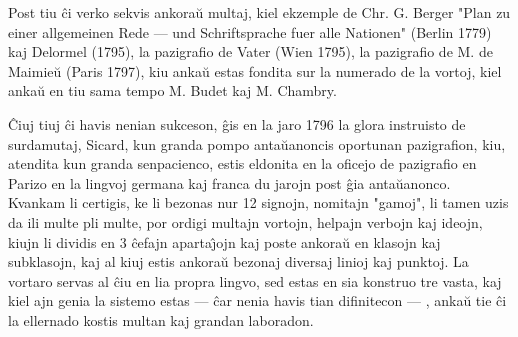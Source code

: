    Post tiu \^ci verko sekvis ankora\u u multaj, kiel ekzemple de
Chr. G. Berger "Plan zu einer allgemeinen Rede --- und
Schriftsprache fuer alle Nationen" (Berlin 1779) kaj Delormel
(1795), la pazigrafio de Vater (Wien 1795), la pazigrafio de M. de
Maimie\u u (Paris 1797), kiu anka\u u estas fondita sur la numerado
de la vortoj, kiel anka\u u en tiu sama tempo M. Budet kaj M.
Chambry.

   \^Ciuj tiuj \^ci havis nenian sukceson, \^gis en la jaro 1796 la glora
instruisto de surdamutaj, Sicard, kun granda pompo anta\u uanoncis
oportunan pazigrafion, kiu, atendita kun granda senpacienco, estis
eldonita en la oficejo de pazigrafio en Parizo en la lingvoj germana
kaj franca du jarojn post \^gia anta\u uanonco. Kvankam li certigis,
ke li bezonas nur 12 signojn, nomitajn "gamoj", li tamen uzis da
ili multe pli multe, por ordigi multajn vortojn, helpajn verbojn kaj
ideojn, kiujn li dividis en 3 \^cefajn aparta\^{\j}ojn kaj poste
ankora\u u en klasojn kaj subklasojn, kaj al kiuj estis ankora\u u
bezonaj diversaj linioj kaj punktoj. La vortaro servas al \^ciu en
lia propra lingvo, sed estas en sia konstruo tre vasta, kaj kiel ajn
genia la sistemo estas --- \^car nenia havis tian difinitecon --- ,
anka\u u tie \^ci la ellernado kostis multan kaj grandan laboradon.

